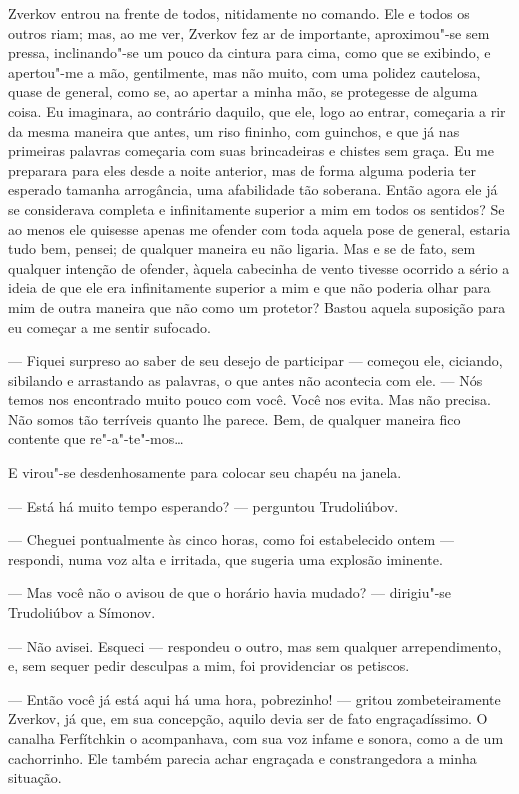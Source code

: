 Zverkov entrou na frente de todos, nitidamente no comando. Ele e todos
os outros riam; mas, ao me ver, Zverkov fez ar de importante,
aproximou"-se sem pressa, inclinando"-se um pouco da cintura para cima,
como que se exibindo, e apertou"-me a mão, gentilmente, mas não muito,
com uma polidez cautelosa, quase de general, como se, ao apertar a
minha mão, se protegesse de alguma coisa. Eu imaginara, ao contrário
daquilo, que ele, logo ao entrar, começaria a rir da mesma maneira que
antes, um riso fininho, com guinchos, e que já nas primeiras palavras
começaria com suas brincadeiras e chistes sem graça. Eu me preparara
para eles desde a noite anterior, mas de forma alguma poderia ter
esperado tamanha arrogância, uma afabilidade tão soberana. Então agora
ele já se considerava completa e infinitamente superior a mim em todos
os sentidos? Se ao menos ele quisesse apenas me ofender com toda aquela
pose de general, estaria tudo bem, pensei; de qualquer maneira eu não
ligaria. Mas e se de fato, sem qualquer intenção de ofender, àquela
cabecinha de vento tivesse ocorrido a sério a ideia de que ele era
infinitamente superior a mim e que não poderia olhar para mim de outra
maneira que não como um protetor? Bastou aquela suposição para eu
começar a me sentir sufocado.

--- Fiquei surpreso ao saber de seu desejo de participar --- começou ele,
ciciando, sibilando e arrastando as palavras, o que antes não acontecia
com ele. --- Nós temos nos encontrado muito pouco com você. Você nos
evita. Mas não precisa. Não somos tão terríveis quanto lhe parece. Bem,
de qualquer maneira fico contente que re"-a"-te"-mos\ldots{}

E virou"-se desdenhosamente para colocar seu chapéu na janela.

--- Está há muito tempo esperando? --- perguntou Trudoliúbov.

--- Cheguei pontualmente às cinco horas, como foi estabelecido ontem ---
respondi, numa voz alta e irritada, que sugeria uma explosão iminente.

--- Mas você não o avisou de que o horário havia mudado? --- dirigiu"-se
Trudoliúbov a Símonov.

--- Não avisei. Esqueci --- respondeu o outro, mas sem qualquer
arrependimento, e, sem sequer pedir desculpas a mim, foi providenciar
os petiscos.

--- Então você já está aqui há uma hora, pobrezinho! --- gritou
zombeteiramente Zverkov, já que, em sua concepção, aquilo devia ser de
fato engraçadíssimo. O canalha Ferfítchkin o acompanhava, com sua voz
infame e sonora, como a de um cachorrinho. Ele também parecia achar
engraçada e constrangedora a minha situação.

